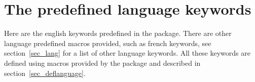 \documentclass[a4paper]{article}
\begin{document}

\section{The predefined language keywords}\label{predefkeywords}

Here are the english keywords predefined in the package. There are other
language predefined macros provided, such as french keywords, see
section~\ref{sec_lang} for a list of other language keywords. All these keywords
are defined using macros provided by the package and described in
section~\ref{sec_deflanguage}.

\end{document}
